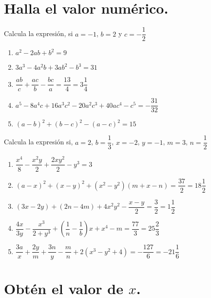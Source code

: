 \documentclass[12pt]{article}
\begin{document}
\section{Halla el valor numérico.}

Calcula la expresión, si $a = -1$, $b = 2$ y $c = - \dfrac{1}{2}$

\begin{enumerate}
\item $a^{2} - 2 a b + b^{2} = 9$
\item $3 a^{3} - 4 a^{2} b + 3 a b^{2} - b^{3} = 31$
\item $\dfrac{a b}{c} + \dfrac{a c}{b} - \dfrac{b c}{a} = \dfrac{13}{4} = 3 \dfrac{1}{4}$
\item $a^{5} - 8 a^{4} c + 16 a^{3} c^{2} - 20 a^{2} c^{3} + 40 a c^{4} - c^{5} = - \dfrac{31}{32}$
\item $(a - b)^{2} + (b - c)^{2} - (a - c)^{2} = 15 $
\end{enumerate}

Calcula la expresión si, $a = 2$, $b = \dfrac{1}{3}$, $x = -2$, $y = -1$, $m = 3$, $n = \dfrac{1}{2}$

\begin{enumerate}
\item $\dfrac{x^{4}}{8} - \dfrac{x^{2} y}{2} + \dfrac{2 x y^{2}}{2} - y^{3} = 3$
\item $(a - x)^{2} + (x - y)^{2} + (x^{2} - y^{2}) (m + x - n) = \dfrac{37}{2} = 18 \dfrac{1}{2}$
\item $(3 x - 2 y) + (2 n - 4 m) + 4 x^{2} y^{2} - \dfrac{x - y}{2} = \dfrac{3}{2} = 1 \dfrac{1}{2}$
\item $\dfrac{4 x}{3 y} - \dfrac{x^{3}}{2 + y^{3}} + \left( \dfrac{1}{n} - \dfrac{1}{b} \right) x + x^{4} - m = \dfrac{77}{3} = 25 \dfrac{2}{3}$
\item $\dfrac{3 a}{x} + \dfrac{2 y}{m} + \dfrac{3 n}{y} - \dfrac{m}{n} + 2 (x^{3} - y^{2} + 4) = - \dfrac{127}{6} = -21 \dfrac{1}{6}$
\end{enumerate}

\section{Obtén el valor de $x$.}
\end{document}
